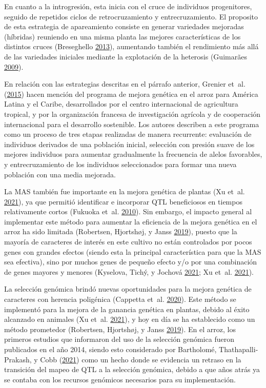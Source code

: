 \documentclass[11pt,spanish,a4paper,oneside,]{book} %
\begin{document}
En cuanto a la introgresión, esta inicia con el cruce de individuos progenitores, seguido de repetidos ciclos de retrocruzamiento y entrecruzamiento. El proposito de esta estrategia de apareamiento consiste en generar variedades mejoradas (híbridas) reuniendo en una misma planta las mejores características de los distintos cruces (Breseghello \protect\hyperlink{ref-cite:57}{2013}), aumentando también el rendimiento más allá de las variedades iniciales mediante la explotación de la heterosis (Guimarães \protect\hyperlink{ref-cite:62}{2009}).

En relación con las estrategias descritas en el párrafo anterior, Grenier et~al. (\protect\hyperlink{ref-cite:65}{2015}) hacen mención del programa de mejora genética en el arroz para América Latina y el Caribe, desarrollados por el centro internacional de agricultura tropical, y por la organización francesa de investigación agrícola y de cooperación internacional para el desarrollo sostenible. Los autores describen a este programa como un proceso de tres etapas realizadas de manera recurrente: evaluación de individuos derivados de una población inicial, selección con presión suave de los mejores individuos para aumentar gradualmente la frecuencia de alelos favorables, y entrecruzamiento de los individuos seleccionados para formar una nueva población con una media mejorada.

La MAS también fue importante en la mejora genética de plantas (Xu et~al. \protect\hyperlink{ref-cite:60}{2021}), ya que permitió identificar e incorporar QTL beneficiosos en tiempos relativamente cortos (Fukuoka et~al. \protect\hyperlink{ref-cite:61}{2010}). Sin embargo, el impacto general al implementar este método para aumentar la eficiencia de la mejora genética en el arroz ha sido limitada (Robertsen, Hjortshøj, y Janss \protect\hyperlink{ref-cite:63}{2019}), puesto que la mayoría de caracteres de interés en este cultivo no están controlados por pocos genes con grandes efectos (siendo esta la principal característica para que la MAS sea efectiva), sino por muchos genes de pequeño efecto y/o por una combinación de genes mayores y menores (Kyselova, Tichý, y Jochová \protect\hyperlink{ref-cite:32}{2021}; Xu et~al. \protect\hyperlink{ref-cite:60}{2021}).

La selección genómica brindó nuevas oportunidades para la mejora genética de caracteres con herencia poligénica (Cappetta et~al. \protect\hyperlink{ref-cite:64}{2020}). Este método se implementó para la mejora de la ganancia genética en plantas, debido al éxito alcanzado en animales (Xu et~al. \protect\hyperlink{ref-cite:60}{2021}), y hoy en día se ha establecido como un método prometedor (Robertsen, Hjortshøj, y Janss \protect\hyperlink{ref-cite:63}{2019}). En el arroz, los primeros estudios que informaron del uso de la selección genómica fueron publicados en el año 2014, siendo esto considerado por Bartholomé, Thathapalli-Prakash, y Cobb (\protect\hyperlink{ref-cite:58}{2021}) como un hecho donde se evidencia un retraso en la transición del mapeo de QTL a la selección genómica, debido a que años atrás ya se contaba con los recursos genómicos necesarios para su implementación.
\end{document}
